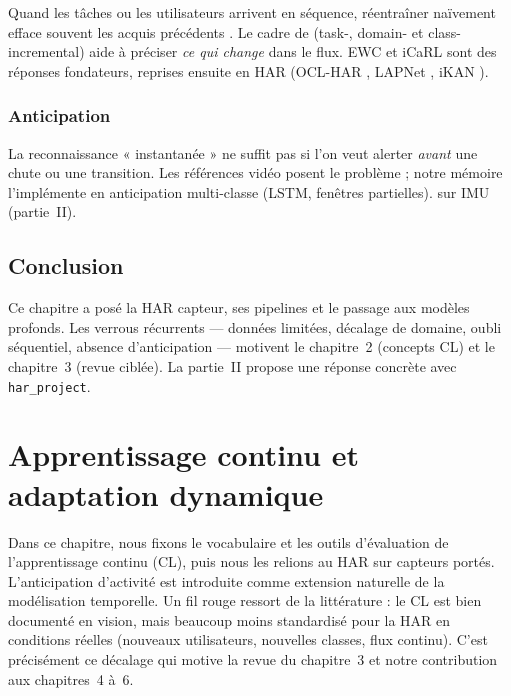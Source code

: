\documentclass[a4paper,12pt]{report}
\begin{document}
Quand les tâches ou les utilisateurs arrivent en séquence, réentraîner naïvement
efface souvent les acquis précédents \parencite{kirkpatrick2017,parisi2019}. Le
cadre de \textcite{vdven2022} (task-, domain- et class-incremental) aide à
préciser \emph{ce qui change} dans le flux. EWC \parencite{kirkpatrick2017} et
iCaRL \parencite{rebuffi2017} sont des réponses fondateurs, reprises ensuite en
HAR (OCL-HAR \parencite{schiemer2023}, LAPNet \parencite{adaimi2022}, iKAN
\parencite{liu2024}).

\subsection{Anticipation}

La reconnaissance « instantanée » ne suffit pas si l'on veut alerter \emph{avant}
une chute ou une transition. Les références vidéo \parencite{ryoo2011,gammulle2019}
posent le problème ; notre mémoire l'implémente en anticipation multi-classe
(LSTM, fenêtres partielles).
sur IMU (partie~II).

\section{Conclusion}

Ce chapitre a posé la HAR capteur, ses pipelines et le passage aux modèles
profonds. Les verrous récurrents — données limitées, décalage de domaine, oubli
séquentiel, absence d'anticipation — motivent le chapitre~2 (concepts CL) et le
chapitre~3 (revue ciblée). La partie~II propose une réponse concrète avec
\texttt{har\_project}.

\clearpage


\clearpage
\chapter{Apprentissage continu et adaptation dynamique}
\label{ch:07-Chapter2}

Dans ce chapitre, nous fixons le vocabulaire et les outils d'évaluation de
l'apprentissage continu (CL), puis nous les relions au HAR sur capteurs portés.
L'anticipation d'activité est introduite comme extension naturelle de la
modélisation temporelle. Un fil rouge ressort de la littérature : le CL est
bien documenté en vision, mais beaucoup moins standardisé pour la HAR en
conditions réelles (nouveaux utilisateurs, nouvelles classes, flux continu).
C'est précisément ce décalage qui motive la revue du chapitre~3 et notre
contribution aux chapitres~4 à~6.
\end{document}
